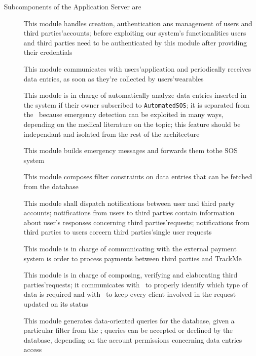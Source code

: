 \documentclass[../DD0.tex]{subfiles}
\begin{document}
        Subcomponents of the Application Server are
        \begin{description}
          \item[\AccountManager] This module handles creation, authentication ans management of users and third parties'accounts; before exploiting our system's functionalities users and third parties need to be authenticated by this module after providing their credentials
          \item[\DataCollector] This module communicates with users'application and periodically receives data entries, as soon as they're collected by users'wearables
          \item[\EmergencyDetector] This module is in charge of automatically analyze data entries inserted in the system if their owner subscribed to \texttt{AutomatedSOS}; it is separated from the \DataCollector\ because emergency detection can be exploited in many ways, depending on the medical literature on the topic; this feature should be independant and isolated from the rest of the architecture
          \item[\EmergencyDispatcher] This module builds emergency messages and forwards them tothe SOS system
          \item[\FilterManager] This module composes filter constraints on data entries that can be fetched from the database
          \item[\NotificationManager] This module shall dispatch notifications between user and third party accounts; notifications from users to third parties contain information about user's responses concerning third parties'requests; notifications from third parties to users corcern third parties'single user requests
          \item[\PaymentGateway] This module is in charge of communicating with the external payment system is order to process payments between third parties and TrackMe
          \item[\RequestManager] This module is in charge of composing, verifying and elaborating third parties'requests; it communicates with \FilterManager\ to properly identify which type of data is required and with \NotificationManager\ to keep every client involved in the request updated on its status
          \item[\SetBuilder] This module generates data-oriented queries for the database, given a particular filter from the \FilterManager; queries can be accepted or declined by the database, depending on the account permissions concerning data entries access
        \end{description}
\end{document}
